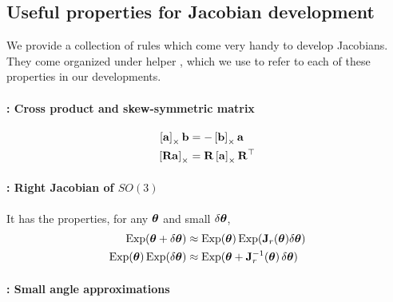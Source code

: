\subsection{Useful properties for Jacobian development}
\label{sec:DosDonts}

We provide a collection of rules which come very handy to develop Jacobians. They come organized under helper \!\!\!\!, which we use to refer to each of these properties in our developments.


%

\paragraph{\ccross : Cross product and skew-symmetric matrix}
%
\begin{align}
\left[{\bf a}\right]_\times{\bf b} &= -\left[{\bf b}\right]_\times{\bf a} 
\\
\left[{\bf R}{\bf a}\right]_\times &= {\bf R}\left[{\bf a}\right]_\times{\bf R}^{\top} 
\end{align}

\paragraph{\cJr : Right Jacobian of $SO(3)$ }

It has the properties, for any ${{\bm \theta}}$ and small ${\delta{{\bm \theta}}}$,
%
\begin{align}
\operatorname*{Exp}({{\bm \theta}}+{\delta{{\bm \theta}}}) &\approx \operatorname*{Exp}({{\bm \theta}})\operatorname*{Exp}({\bf J}_r({{\bm \theta}}){\delta{{\bm \theta}}}) \\
\operatorname*{Exp}({{\bm \theta}})\operatorname*{Exp}({\delta{{\bm \theta}}}) &\approx \operatorname*{Exp}({{\bm \theta}}+{\bf J}_r^{-1}({{\bm \theta}})\,{\delta{{\bm \theta}}}) 
\end{align}
%






\paragraph{\csmall : Small angle approximations}

